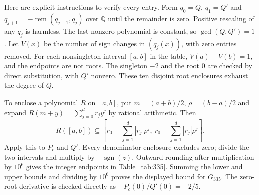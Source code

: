 \documentclass[11pt,a4paper]{article}
\theoremstyle{remark}
\DeclareMathOperator{\sgn}{sgn}
\begin{document}
Here are explicit instructions to verify every entry. Form
$q_0=Q$, $q_1=Q'$ and
$q_{j+1}=-\operatorname{rem}(q_{j-1},q_j)$ over $\mathbb Q$ until
the remainder is zero. Positive rescaling of any $q_j$ is harmless.
The last nonzero polynomial is constant, so $\gcd(Q,Q')=1$.
Let $V(x)$ be the number of sign changes in $(q_j(x))$, with zero
entries removed. For each nonsingleton interval $[a,b]$ in the
table, $V(a)-V(b)=1$, and the endpoints are not roots.
The singleton $-2$ and the root $0$ are checked by direct
substitution, with $Q'$ nonzero. These ten disjoint root enclosures
exhaust the degree of $Q$.

To enclose a polynomial $R$ on $[a,b]$, put
$m=(a+b)/2$, $\rho=(b-a)/2$ and expand
$R(m+y)=\sum_{j=0}^d r_jy^j$ by rational arithmetic. Then
\[
 R([a,b])\subseteq
 \left[r_0-\sum_{j=1}^d|r_j|\rho^j,\
       r_0+\sum_{j=1}^d|r_j|\rho^j\right].
\]
Apply this to $P_c$ and $Q'$. Every denominator enclosure excludes
zero; divide the two intervals and multiply by $-\sgn(z)$.
Outward rounding after multiplication by $10^6$ gives the integer
endpoints in Table~\ref{tab:335}. Summing the lower and upper bounds
and dividing by $10^6$ proves the displayed bound for $G_{335}$.
The zero-root derivative is checked directly as
$-P_c(0)/Q'(0)=-2/5$.



\end{document}

